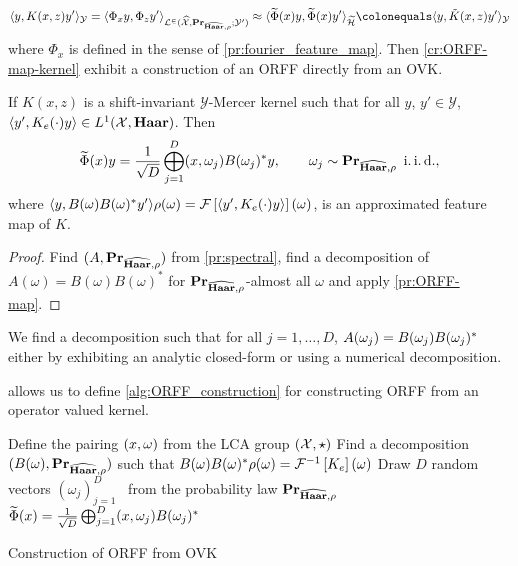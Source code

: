 \begin{dmath*}
\inner{y, K(x,z)y'}_{\mathcal{Y}}=\inner{\Phi_x y, \Phi_z y'}_{\mathcal{L^2(\dual{\mathcal{X}},\probability_{\dual{\Haar},\rho};\mathcal{Y'})}}\approx \inner{\tildePhi{\omega}(x)y, \tildePhi{\omega}(x)y'}_{\tildeH{\omega}}\colonequals \inner{y, \tilde{K}(x,z)y'}_{\mathcal{Y}}
\end{dmath*}
where $\Phi_x$ is defined in the sense of \cref{pr:fourier_feature_map}. Then \cref{cr:ORFF-map-kernel} exhibit a construction of an \acs{ORFF} directly from an \acs{OVK}.
\begin{corollary}
\label{cr:ORFF-map-kernel}
If $K(x,z)$ is a shift-invariant $\mathcal{Y}$-Mercer kernel such that for all $y$, $y'\in\mathcal{Y}$, $\langle y', K_e(\cdot)y\rangle\in L^1(\mathcal{X},\mathbf{Haar})$. Then
\begin{equation}
\widetilde{\Phi}(x)y= \frac{1}{\sqrt{D}}\operatorname*{\bigoplus}_{j=1}^D(x, \omega_j)B(\omega_j)^* y, \qquad \omega_j \sim {\mathbf{{Pr}}}_{\widehat{\mathbf{Haar}},\rho} \enskip\text{i.\,i.\,d.},
\end{equation}
where $\langle y, B(\omega)B(\omega)^* y'\rangle\rho(\omega)=\mathcal{F}\left[\langle y', K_e(\cdot)y\rangle\right](\omega)$, is an approximated feature map of $K$.
\end{corollary}
\begin{proof}
Find $(A, {\mathbf{{Pr}}}_{\widehat{\mathbf{Haar}},\rho})$ from \cref{pr:spectral}, find a decomposition of $A(\omega)=B(\omega)B(\omega)^*$ for ${\mathbf{{Pr}}}_{\widehat{\mathbf{Haar}},\rho}$-almost all $\omega$ and apply \cref{pr:ORFF-map}.
\end{proof}
\begin{remark}
We find a decomposition such that for all $j=1, \ldots, D$, $A(\omega_j)=B(\omega_j)B(\omega_j)^* $ either by exhibiting an analytic closed-form or using a numerical decomposition.
\end{remark}
 allows us to define \cref{alg:ORFF_construction} for constructing \acs{ORFF} from an operator valued kernel.
\begin{center}
\begin{algorithm2e}[H]\label{alg:ORFF_construction}
	\SetAlgoLined
    \BlankLine
	Define the pairing $(x, \omega)$ from the \acs{LCA} group $(\mathcal{X}, \star)$\;
	Find a decomposition $(B(\omega),{\mathbf{{Pr}}}_{\widehat{\mathbf{Haar}},\rho})$ such that $B(\omega)B(\omega)^* \rho(\omega)=\mathcal{F}^{-1}\left[K_e\right](\omega)$\;
	Draw $D$ random vectors $(\omega_j)_{j=1}^D$ \iid~from the probability law ${\mathbf{{Pr}}}_{\widehat{\mathbf{Haar}},\rho}$\;
   \Return $\widetilde{\Phi}(x)=\frac{1}{\sqrt{D}}\operatorname*{\bigoplus}_{j=1}^D(x, \omega_j)B(\omega_j)^* $\;
   \caption{Construction of \acs{ORFF} from \acs{OVK}}
   \label{al:ORFF_construction}
\end{algorithm2e}
\end{center}

